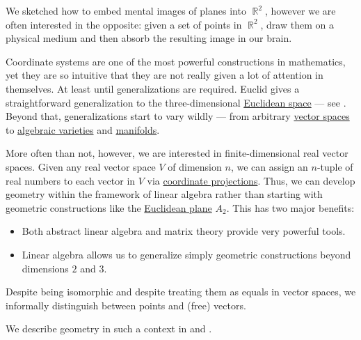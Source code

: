 \begin{remark}\label{rem:coordinate_systems}
  We sketched how to embed mental images of planes into \( \BbbR^2 \), however we are often interested in the opposite: given a set of points in \( \BbbR^2 \), draw them on a physical medium and then absorb the resulting image in our brain.

  Coordinate systems are one of the most powerful constructions in mathematics, yet they are so intuitive that they are not really given a lot of attention in themselves. At least until generalizations are required. Euclid gives a straightforward generalization to the three-dimensional \hyperref[def:euclidean_space]{Euclidean space} --- see \cite{Fitzpatrick2008}. Beyond that, generalizations start to vary wildly --- from arbitrary \hyperref[def:vector_space]{vector spaces} to \hyperref[def:affine_algebraic_set]{algebraic varieties} and \hyperref[def:topological_manifold]{manifolds}.

  More often than not, however, we are interested in finite-dimensional real vector spaces. Given any real vector space \( V \) of dimension \( n \), we can assign an \( n \)-tuple of real numbers to each vector in \( V \) via \hyperref[def:basis_decomposition]{coordinate projections}. Thus, we can develop geometry within the framework of linear algebra rather than starting with geometric constructions like the \hyperref[def:euclidean_plane]{Euclidean plane} \( A_2 \). This has two major benefits:
  \begin{itemize}
    \item Both abstract linear algebra and matrix theory provide very powerful tools.
    \item Linear algebra allows us to generalize simply geometric constructions beyond dimensions \( 2 \) and \( 3 \).
  \end{itemize}

  Despite being isomorphic and despite treating them as equals in vector spaces, we informally distinguish between points and (free) vectors.

  We describe geometry in such a context in  and .
\end{remark}
